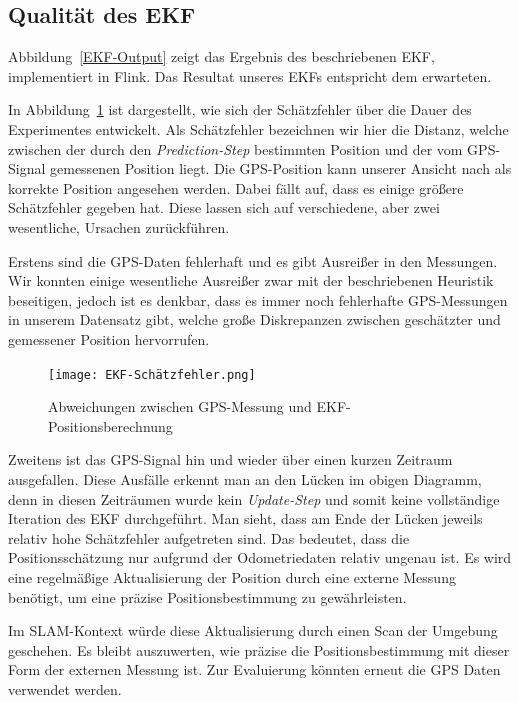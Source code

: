 \documentclass[11pt]{article}
\begin{document}
\subsection{Qualität des EKF}
Abbildung~\ref{EKF-Output} zeigt das Ergebnis des beschriebenen EKF, implementiert in Flink. Das Resultat unseres EKFs entspricht dem erwarteten.

In Abbildung~\ref{EKF-Schätzfehler} ist dargestellt, wie sich der Schätzfehler über die Dauer des Experimentes entwickelt. Als Schätzfehler bezeichnen wir hier die Distanz, welche zwischen der durch den \textit{Prediction-Step} bestimmten Position und der vom GPS-Signal gemessenen Position liegt. Die GPS-Position kann unserer Ansicht nach als korrekte Position angesehen werden. 
Dabei fällt auf, dass es einige größere Schätzfehler gegeben hat. Diese lassen sich auf verschiedene, aber zwei wesentliche, Ursachen zurückführen.


Erstens sind die GPS-Daten fehlerhaft und es gibt Ausreißer in den Messungen. Wir konnten einige wesentliche Ausreißer zwar mit der beschriebenen Heuristik beseitigen, jedoch ist es denkbar, dass es immer noch fehlerhafte GPS-Messungen in unserem Datensatz gibt, welche große Dis\-kre\-pan\-zen zwischen geschätzter und gemessener Position hervorrufen.

\begin{figure}[H]
	\centering
	\texttt{[image: EKF-Schätzfehler.png]}
	\caption{Abweichungen zwischen GPS-Messung und EKF-Positionsberechnung}
	\label{EKF-Schätzfehler}
\end{figure}

Zweitens ist das GPS-Signal hin und wieder über einen kurzen Zeitraum ausgefallen. Diese Ausfälle erkennt man an den Lücken im obigen Diagramm, denn in diesen Zeiträumen wurde kein \textit{Update-Step} und somit keine vollständige Iteration des EKF durchgeführt. Man sieht, dass am Ende der Lücken jeweils relativ hohe Schätzfehler aufgetreten sind. Das bedeutet, dass die Positionsschätzung nur aufgrund der Odometriedaten relativ ungenau ist. Es wird eine regelmäßige Aktualisierung der Position durch eine externe Messung benötigt, um eine präzise Positionsbestimmung zu gewährleisten.



Im SLAM-Kontext würde diese Aktualisierung durch einen Scan der Umgebung geschehen. Es bleibt auszuwerten, wie präzise die Positionsbestimmung mit dieser Form der externen Messung ist. Zur Evaluierung könnten erneut die GPS Daten verwendet werden.
\end{document}
